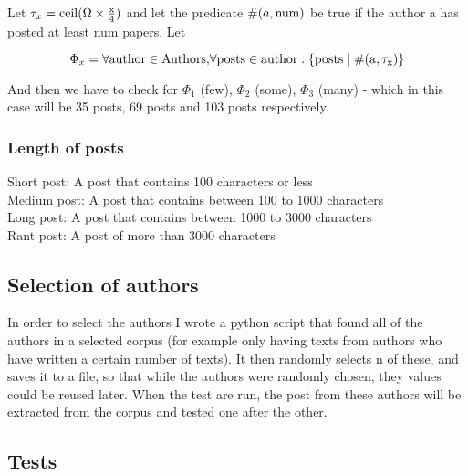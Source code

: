 Let $\tau_x = \rm{ceil}(\Omega \times \frac{x}{4})$ and let the predicate $\#(a, \rm{num})$ be true if the author a has posted at least num papers. Let 

$$\Phi_x = \forall\rm{ author }\in\rm{ Authors, }\forall\rm{ posts }\in\rm{ author }: \{\rm{posts }\mid \#(a, \tau_x)\}$$ 
 
And then we have to check for $\Phi_1$ (few), $\Phi_2$ (some), $\Phi_3$ (many) - which in this case will be 35 posts, 69 posts and 103 posts respectively.

\subsubsection*{Length of posts}
Short post: A post that contains 100 characters or less\\
Medium post: A post that contains between 100 to 1000 characters\\
Long post: A post that contains between 1000 to 3000 characters\\
Rant post: A post of more than 3000 characters


\subsection{Selection of authors}
In order to select the authors I wrote a python script that found all of the authors in a selected corpus (for example only having texts from authors who have written a certain number of texts). It then randomly selects n of these, and saves it to a file, so that while the authors were randomly chosen, they values could be reused later. When the test are run, the post from these authors will be extracted from the corpus and tested one after the other.


\subsection{Tests}



